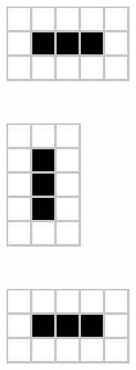 \documentclass[../proyecto.tex]{memoir}
\begin{document}
\begin{figure}[H]
	\centering
	\begin{subfigure}[b]{0.3\linewidth} 
        \centering
        \includegraphics[height=.35\linewidth]{./images/blinker1.png}
        \caption{}
        \label{fig:blinker1}
    \end{subfigure}
    \ 
	\begin{subfigure}[b]{0.3\linewidth} 
        \centering
        \includegraphics[height=.45\linewidth]{./images/blinker2.png}
        \caption{}
        \label{fig:blinker2}
    \end{subfigure}
    \ 	
    \begin{subfigure}[b]{0.3\linewidth} 
        \centering
        \includegraphics[height=.35\linewidth]{./images/blinker3.png}
        \caption{}
        \label{fig:blinker3}
    \end{subfigure}
    \\
	\begin{subfigure}[b]{0.3\linewidth} 
        \centering

\end{subfigure}
\end{figure}
\end{document}
